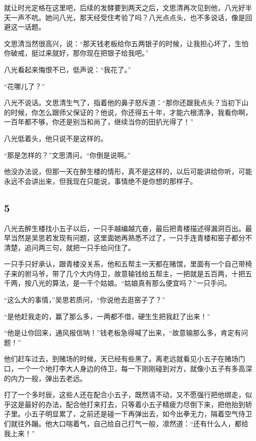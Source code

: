 就让时光定格在这里吧，后续的发酵要到两天之后，文思清再次见到他，八光好半天一声不吭。她问八光，那天经受住考验了吗？八光点点头，也不多说话，像是回避这一话题。

文思清当然很高兴，说：“那天钱老板给你五两银子的时候，让我担心坏了，生怕你破戒，挺过来就好，那你现在把银子给我吧。”

八光看起来悔恨不已，低声说：“我花了。”

“花哪儿了？”

八光不说话。文思清生气了，指着他的鼻子怒斥道：“那你还跟我点头？当初下山的时候，你怎么跟师父保证的？他说，你还得五十年，才能六根清净，我看你啊，一百年都不够，你还是别当和尚了，继续当你的田扒光得了！”

八光低着头，他只说不是这样的。

“那是怎样的？”文思清问，“你倒是说啊。”

他没办法说，但那一天在醉生楼的情形，真不是这样的，以后可能讲给你听，可能永远不会讲出来，但我现在只能说，事情绝不是你想的那样子。
\newline

{\centering\subsection{5}}

八光去醉生楼找小五子以后，一只手越编越亢奋，最后把青楼描述得漏洞百出。最早当然是吴思若发现有问题，这里面她再熟悉不过了，一只手连青楼和窑子都分不清楚，追问两三句，就把一只手给问住了。

一只手只好承认，跟青楼没关系，他和五帮主一天都在赌馆，里面有一个自己带椅子来的驸马爷，带了几个大内侍卫，故意输钱给五帮主，一把就是五百两，十把五千两，按八光的算法，是一千个姑娘。“姑娘真有那么便宜吗？”一只手问。

“这么大的事情，”吴思若质问，“你说他去逛窑子了？”

“是他赶我走的，赢了那么多，一两都不借，硬生生把我赶了出来！”

“他是让你回来，通风报信呐！”钱老板急得喊了出来，“故意输那么多，肯定有问题！”

他们赶车过去，到赌场的时候，天已经有些黑了。离老远就看见小五子在赌场门口，一个一个地打李大人身边的侍卫，每一下刚刚碰到对方，就像小五子有多高深的内力一般，弹出去老远。

打了一个多时辰，这些人还在配合小五子，既然请不动，又不愿强行把他绑走，似乎这是最好的办法，配合他打来打去，只等着小五子精疲力尽倒下来，把他抬到轿子里。小五子明显累了，之前还是碰一下再弹出去，如今出拳无力，隔着空气侍卫们就往外蹦。他大口喘着气，自己给自己打气一般，凛然道：“还有什么人，都给我上来！”

